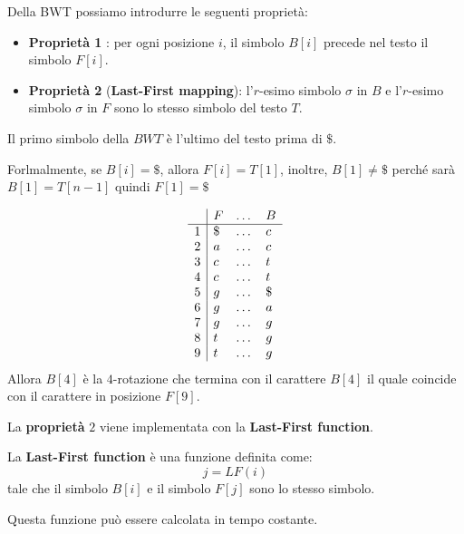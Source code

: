 Della BWT possiamo introdurre le seguenti proprietà:
\begin{itemize}
    \item \textbf{Proprietà 1} \label{proprietà-1}: per ogni posizione $i$, il
          simbolo $B[i]$ precede nel testo il simbolo $F[i]$.
    \item \textbf{Proprietà 2} \label{lfmapping} (\textbf{Last-First mapping}):
          l'$r$-esimo simbolo $\sigma$ in $B$ e l'$r$-esimo simbolo $\sigma$ in
          $F$ sono lo stesso simbolo del testo $T$.
\end{itemize}
\begin{nota}
    Il primo simbolo della $BWT$ è l'ultimo del testo prima di $\$$.

    Forlmalmente, se $B[i] = \$$, allora $F[i] = T[1]$, inoltre,
    $B[1] \neq \$$ perché sarà $B[1] = T[n - 1] $ quindi $F[1] = \$$
\end{nota}
\begin{esempio} %
    \begin{equation}
        \begin{array}{l|l c l}
              & F  & \dots & B  \\
            \hline
            1 & \$ & \dots & c  \\
            2 & a  & \dots & c  \\
            3 & c  & \dots & t  \\
            4 & c  & \dots & t  \\
            5 & g  & \dots & \$ \\
            6 & g  & \dots & a  \\
            7 & g  & \dots & g  \\
            8 & t  & \dots & g  \\
            9 & t  & \dots & g  \\
        \end{array}
    \end{equation}
    Allora $B[4]$ è la $4$-rotazione che termina con il carattere $B[4]$ il quale
    coincide con il carattere in posizione $F[9]$.
\end{esempio}
La \textbf{proprietà} $2$ viene implementata con la \textbf{Last-First function}.
\begin{definizione}
    La \textbf{Last-First function} è una funzione definita come:
    \begin{equation}
        j = LF(i)
    \end{equation}
    tale che il simbolo $B[i]$ e il simbolo $F[j]$ sono lo stesso simbolo.
\end{definizione}
Questa funzione può essere calcolata in tempo costante.

